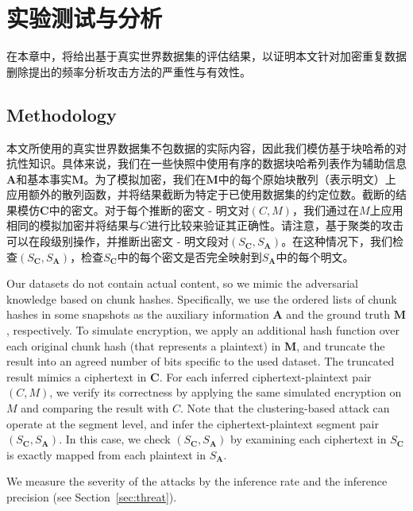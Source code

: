 \chapter{实验测试与分析}
\label{sec:Experiment}

在本章中，将给出基于真实世界数据集的评估结果，以证明本文针对加密重复数据删除提出的频率分析攻击方法的严重性与有效性。

\section{Methodology}
\label{sec:dataset}

本文所使用的真实世界数据集不包数据的实际内容，因此我们模仿基于块哈希的对抗性知识。具体来说，我们在一些快照中使用有序的数据块哈希列表作为辅助信息$\mathbf{A}$和基本事实$\mathbf{M}$。为了模拟加密，我们在$\mathbf{M}$中的每个原始块散列（表示明文）上应用额外的散列函数，并将结果截断为特定于已使用数据集的约定位数。截断的结果模仿$\mathbf{C}$中的密文。对于每个推断的密文 - 明文对$(C,M)$，我们通过在$M$上应用相同的模拟加密并将结果与​​$C$进行比较来验证其正确性。请注意，基于聚类的攻击可以在段级别操作，并推断出密文 - 明文段对$(S_\mathbf{C},S_\mathbf {A})$。在这种情况下，我们检查$(S_\mathbf {C},S_\mathbf{A})$，检查$S_\mathbf{C}$中的每个密文是否完全映射到$S_\mathbf{A}$中的每个明文。



Our datasets do not contain actual content, so we mimic the adversarial knowledge based on chunk hashes. Specifically, we use the ordered lists of chunk hashes in some snapshots as the auxiliary information $\mathbf{A}$ and the ground truth $\mathbf{M}$, respectively. To simulate encryption, we apply an additional hash function over each original chunk hash (that represents a plaintext) in $\mathbf{M}$, and truncate the result into an agreed number of bits specific to the used dataset. The truncated result mimics a ciphertext in $\mathbf{C}$. For each inferred ciphertext-plaintext pair $(C, M)$, we verify its correctness by applying the same simulated encryption on $M$ and comparing the result with $C$. Note that the clustering-based attack can operate at the segment level, and infer the ciphertext-plaintext segment pair $(S_\mathbf{C}, S_\mathbf{A})$.  In this case, we check $(S_\mathbf{C}, S_\mathbf{A})$ by examining each ciphertext in $S_\mathbf{C}$ is exactly mapped from each plaintext in $S_\mathbf{A}$.

We measure the severity of the attacks by the inference rate and the inference precision (see Section~\ref{sec:threat}). 

